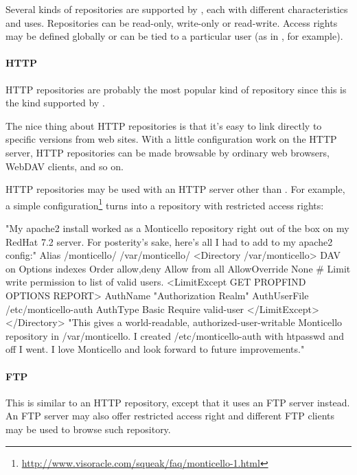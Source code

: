 \documentclass[a4paper,10pt,twoside]{book}
\begin{document}
Several kinds of repositories are supported by \MC, each with different characteristics and uses. Repositories can be read-only, write-only or read-write. Access rights may be defined globally or can be tied to a particular user (as in \sqsrc, for example).

\paragraph{HTTP} HTTP repositories are probably the most popular kind of repository since this is the kind supported by \sqsrc. %

The nice thing about HTTP repositories is that it's easy to link directly to specific versions from web sites. With a little configuration work on the HTTP server, HTTP repositories can be made browsable by ordinary web browsers, WebDAV clients, and so on.

HTTP repositories may be used with an HTTP server other than \ind{\sqsrc}. For example, a simple configuration\footnote{\url{http://www.visoracle.com/squeak/faq/monticello-1.html}} turns  into a \MC repository with restricted access rights:

\begin{code}{}
"My apache2 install worked as a Monticello repository right out of the box on my
RedHat 7.2 server.  For posterity's sake, here's all I had to add to my apache2 config:"
Alias /monticello/ /var/monticello/
<Directory /var/monticello>
  DAV on
  Options indexes
  Order allow,deny
  Allow from all
  AllowOverride None
  # Limit write permission to list of valid users.
  <LimitExcept GET PROPFIND OPTIONS REPORT>
    AuthName "Authorization Realm"
    AuthUserFile /etc/monticello-auth
    AuthType Basic
    Require valid-user
  </LimitExcept>
</Directory>
"This gives a world-readable, authorized-user-writable Monticello repository in
/var/monticello.  I created /etc/monticello-auth with htpasswd and off I went.
I love Monticello and look forward to future improvements."
\end{code}

\paragraph{FTP} This is similar to an HTTP repository, except that it uses an FTP server instead. An FTP server may also offer restricted access right and different FTP clients may be used to browse such \MC repository.
\end{document}
